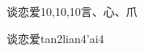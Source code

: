 \begin{entry}{谈恋爱}{10,10,10}{⾔、⼼、⽖}
  \begin{phonetics}{谈恋爱}{tan2lian4'ai4}
  \end{phonetics}
\end{entry}
